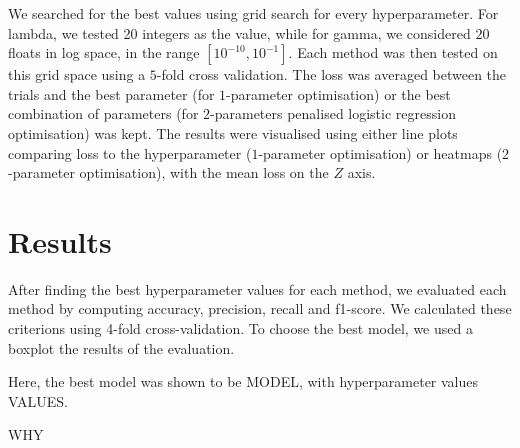 \documentclass{article}
\begin{document}
	We searched for the best values using grid search for every hyperparameter. For lambda, we tested 20 integers as the value, while for gamma, we considered $20$ floats in log space, in the range $ [ 10^{-10}, 10^{-1}]$. Each method was then tested on this grid space using a $5$-fold cross validation. The loss was averaged between the trials and the best parameter (for $1$-parameter optimisation) or the best combination of parameters (for $2$-parameters penalised logistic regression optimisation) was kept. The results were visualised using either line plots comparing loss to the hyperparameter ($1$-parameter optimisation) or heatmaps ($2$-parameter optimisation), with the mean loss on the $Z$ axis.
	
	
	
	\section{Results}
	After finding the best hyperparameter values for each method, we evaluated each method by computing accuracy, precision, recall and f1-score. We calculated these criterions using 4-fold cross-validation. To choose the best model, we used a boxplot the results of the evaluation.
	
	Here, the best model was shown to be MODEL, with hyperparameter values VALUES.
	
	WHY
\end{document}
